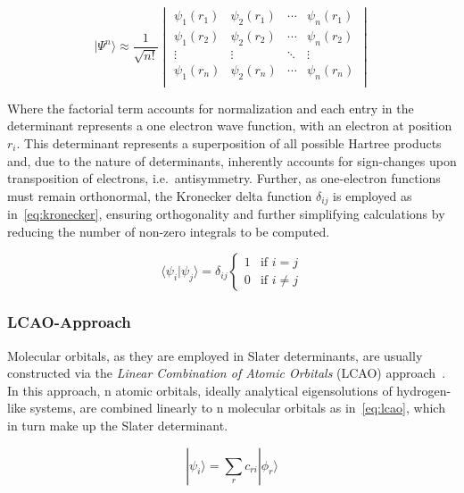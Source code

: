 \documentclass[11pt]{article}
\begin{document}
\begin{equation}
  |\Psi^{n}\rangle \approx \frac{1}{\sqrt{n!}}\begin{vmatrix}
    \psi_1(r_1) & \psi_2(r_1) & \cdots & \psi_n(r_1) \\
    \psi_1(r_2) & \psi_2(r_2) & \cdots & \psi_n(r_2) \\
    \vdots & \vdots & \ddots & \vdots \\
    \psi_1(r_n) & \psi_2(r_n) & \cdots & \psi_n(r_n) \\
  \end{vmatrix}
  \label{eq:slaterDeterminant}
\end{equation}

\bigskip

\noindent Where the factorial term accounts for normalization and each entry in the determinant represents a one electron wave function, with an electron at position $r_i$.
This determinant represents a superposition of all possible Hartree products and, due to the nature of determinants, inherently accounts for sign-changes upon transposition of electrons, i.e.~antisymmetry.
Further, as one-electron functions must remain orthonormal, the Kronecker delta function $\delta_{ij}$ is employed as in~\ref{eq:kronecker}, ensuring orthogonality and further simplifying calculations by reducing the number of non-zero integrals to be computed.



\begin{equation}
  \langle\psi_i|\psi_j\rangle = \delta_{ij}\begin{cases}
    1 & \text{if } i = j \\
    0 & \text{if } i \neq j
  \end{cases} 
  \label{eq:kronecker}
\end{equation}

\bigskip

\subsubsection{LCAO-Approach}
Molecular orbitals, as they are employed in Slater determinants, are usually constructed via the \textit{Linear Combination of Atomic Orbitals} (LCAO) approach~\cite{Slater1954}.
In this approach, n atomic orbitals, ideally analytical eigensolutions of hydrogen-like systems, are combined linearly to n molecular orbitals as in~\ref{eq:lcao}, which in turn make up the Slater determinant.

\begin{equation}
  |\psi_i\rangle = \sum_{r}^{}c_{r i}|\phi_{r}\rangle
  \label{eq:lcao}
\end{equation}
\end{document}
